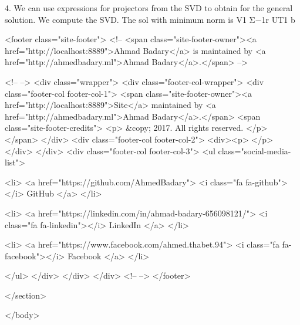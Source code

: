 4. We can use expressions for projectors from the SVD to obtain for the general solution.
    We compute the SVD.
    The sol with minimum norm is V1 Σ−1r UT1 b

      <footer class="site-footer">
    <!--   <span class="site-footer-owner"><a href="http://localhost:8889">Ahmad Badary</a> is maintained by <a href="http://ahmedbadary.ml">Ahmad Badary</a>.</span> -->
    
<!--  -->
    <div class="wrapper">
        <div class="footer-col-wrapper">
            <div class="footer-col footer-col-1">
            <span class="site-footer-owner"><a href="http://localhost:8889">Site</a> maintained by <a href="http://ahmedbadary.ml">Ahmad Badary</a>.</span>
    <span class="site-footer-credits">
        <p>
            &copy; 2017. All rights reserved.
        </p> 
    </span>
            </div>
            <div class="footer-col footer-col-2">
            <div><p>         </p></div>
            </div>
            <div class="footer-col footer-col-3">
                <ul class="social-media-list">
                    
                      <li>
                        <a href="https://github.com/AhmedBadary">
                          <i class="fa fa-github"></i> GitHub
                        </a>
                      </li>
                    
                    
                      <li>
                        <a href="https://linkedin.com/in/ahmad-badary-656098121/">
                          <i class="fa fa-linkedin"></i> LinkedIn
                        </a>
                      </li>
                    
                    
                      <li>
                        <a href="https://www.facebook.com/ahmed.thabet.94">
                          <i class="fa fa-facebook"></i> Facebook
                        </a>
                      </li>
                    
                </ul>
            </div>
        </div>
    </div>
<!--  -->
</footer>


    </section>

  </body>

